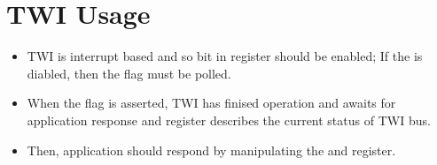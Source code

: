 \documentclass{article}
\begin{document}
\section{TWI Usage}
\begin{itemize}
    \item TWI is interrupt based and so  bit in  register should be enabled; If the  is diabled, then the  flag must be polled.
    \item When the  flag is asserted, TWI has finised operation and awaits for application response and  register describes the current status of TWI bus.
    \item Then, application should respond by manipulating the  and  register.
\end{itemize}
\end{document}
